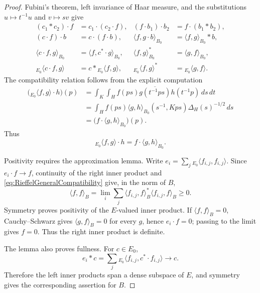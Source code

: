 \documentclass{book}
\begin{document}
\begin{proof}
  Fubini's theorem, left invariance of Haar measure, and the substitutions
  \(u\mapsto t^{-1}u\) and \(v\mapsto sv\) give
  \begin{align*}
    (c_1*c_2)\cdot f&=c_1\cdot(c_2\cdot f),
      &(f\cdot b_1)\cdot b_2&=f\cdot(b_1*b_2),\\
    (c\cdot f)\cdot b&=c\cdot(f\cdot b),
      &\langle f,g\cdot b\rangle_{B_0}
        &=\langle f,g\rangle_{B_0}*b,\\
    \langle c\cdot f,g\rangle_{B_0}
      &=\langle f,c^*\cdot g\rangle_{B_0},
      &\langle f,g\rangle_{B_0}^*
        &=\langle g,f\rangle_{B_0},\\
    {}_{E_0}\!\langle c\cdot f,g\rangle
      &=c*{}_{E_0}\!\langle f,g\rangle,
      &{}_{E_0}\!\langle f,g\rangle^*
        &={}_{E_0}\!\langle g,f\rangle.
  \end{align*}
  The compatibility relation follows from the explicit computation
  \begin{align*}
    \bigl({}_{E_0}\!\langle f,g\rangle\cdot h\bigr)(p)
      &=\int_K\int_H
        f(ps)\overline{g(t^{-1}ps)}h(t^{-1}p)\,ds\,dt\\
      &=\int_Hf(ps)\langle g,h\rangle_{B_0}(s^{-1},Kps)
        \Delta_H(s)^{-1/2}\,ds\\
      &=\bigl(f\cdot\langle g,h\rangle_{B_0}\bigr)(p).
  \end{align*}
  Thus
  \begin{equation}\label{eq:RieffelGeneralCompatibility}
    {}_{E_0}\!\langle f,g\rangle\cdot h
      =f\cdot\langle g,h\rangle_{B_0}.
  \end{equation}

  Positivity requires the approximation lemma.  Write
  \(e_i=\sum_j{}_{E_0}\!\langle f_{i,j},f_{i,j}\rangle\).  Since
  \(e_i\cdot f\to f\), continuity of the right inner product and
  \eqref{eq:RieffelGeneralCompatibility} give, in the norm of \(B\),
  \[
    \langle f,f\rangle_B
      =\lim_i\sum_j
        \langle f_{i,j},f\rangle_B^*
        \langle f_{i,j},f\rangle_B\geq0.
  \]
  Symmetry proves positivity of the \(E\)-valued inner product.  If
  \(\langle f,f\rangle_B=0\), Cauchy--Schwarz gives
  \(\langle g,f\rangle_B=0\) for every \(g\), hence \(e_i\cdot f=0\);
  passing to the limit gives \(f=0\).  Thus the right inner product is
  definite.

  The lemma also proves fullness.  For \(c\in E_0\),
  \[
    e_i*c
      =\sum_j{}_{E_0}\!\langle f_{i,j},c^*\cdot f_{i,j}\rangle
      \longrightarrow c.
  \]
  Therefore the left inner products span a dense subspace of \(E\), and
  symmetry gives the corresponding assertion for \(B\).


\end{proof}
\end{document}
